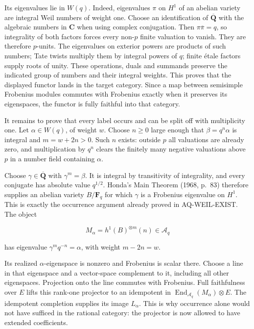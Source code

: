 \documentclass[11pt,a4paper]{article}
\theoremstyle{definition}\newtheorem{definition}[theorem]{Definition}
\theoremstyle{remark}\newtheorem{remark}[theorem]{Remark}
\begin{document}
Its eigenvalues lie in \(W(q)\). Indeed, eigenvalues \(\pi\) on \(H^1\)
of an abelian variety are integral Weil numbers of weight one. Choose an
identification of \(\overline{\mathbf Q}\) with the algebraic numbers in
\(\mathbf C\) when using complex conjugation. Then
\(\pi\overline{\pi}=q\), so integrality of both factors forces every
non-\(p\) finite valuation to vanish. They are therefore \(p\)-units.
The eigenvalues on exterior powers are products of such numbers; Tate
twists multiply them by integral powers of \(q\); finite étale factors
supply roots of unity. These operations, duals and summands preserve the
indicated group of numbers and their integral weights. This proves that
the displayed functor lands in the target category. Since a map between
semisimple Frobenius modules commutes with Frobenius exactly when it
preserves its eigenspaces, the functor is fully faithful into that
category.

It remains to prove that every label occurs and can be split off with
multiplicity one. Let \(\alpha\in W(q)\), of weight \(w\). Choose
\(n\ge0\) large enough that \(\beta=q^n\alpha\) is integral and
\(m=w+2n>0\). Such \(n\) exists: outside \(p\) all valuations are
already zero, and multiplication by \(q^n\) clears the finitely many
negative valuations above \(p\) in a number field containing \(\alpha\).

Choose \(\gamma\in\overline{\mathbf Q}\) with \(\gamma^m=\beta\). It is
integral by transitivity of integrality, and every conjugate has
absolute value \(q^{1/2}\). Honda's Main Theorem (1968, p.~83) therefore
supplies an abelian variety \(B/\mathbf F_q\) for which \(\gamma\) is a
Frobenius eigenvalue on \(H^1\). This is exactly the occurrence argument
already proved in AQ-WEIL-EXIST. The object

\[
 M_\alpha=h^1(B)^{\otimes m}(n)\in\mathcal A_q
\]

has eigenvalue \(\gamma^m q^{-n}=\alpha\), with weight \(m-2n=w\).

Its realized \(\alpha\)-eigenspace is nonzero and Frobenius is scalar
there. Choose a line in that eigenspace and a vector-space complement to
it, including all other eigenspaces. Projection onto the line commutes
with Frobenius. Full faithfulness over \(E\) lifts this rank-one
projector to an idempotent in
\(\operatorname{End}_{\mathcal A_q}(M_\alpha)\otimes E\). The idempotent
completion supplies its image \(L_\alpha\). This is why occurrence alone
would not have sufficed in the rational category: the projector is now
allowed to have extended coefficients.
\end{document}

